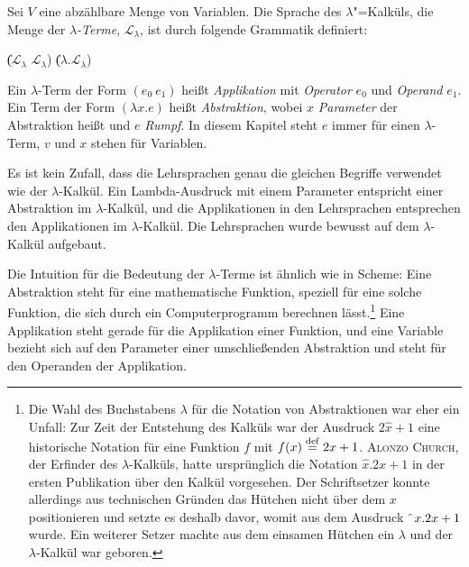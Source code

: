 \begin{definition}
  
  Sei $V$ eine abzählbare Menge von Variablen. 
  Die Sprache des $\lambda$"=Kalküls, die Menge der
  \textit{$\lambda$-Terme},
  $\mathcal{L}_{\lambda}$, ist
  durch folgende Grammatik definiert:
  \begin{grammar}
     \: 
    \> \| ($\mathcal{L}_{\lambda}$ $\mathcal{L}_{\lambda}$)
    \> \| ($\lambda$.$\mathcal{L}_{\lambda}$)
  \end{grammar}
%
Ein $\lambda$-Term der Form $(e_0~e_1)$ heißt 
\textit{Applikation} mit \textit{Operator} $e_0$ und \textit{Operand}
$e_1$.  Ein Term der Form $(\lambda x.e)$ heißt \textit{Abstraktion},
wobei $x$ \textit{Parameter} der Abstraktion heißt und $e$
\textit{Rumpf}.  In diesem Kapitel steht $e$ immer für
einen $\lambda$-Term, $v$ und $x$ stehen für Variablen.
\end{definition}
%
Es ist kein Zufall, dass die Lehrsprachen genau die gleichen Begriffe verwendet
wie der $\lambda$-Kalkül.  Ein Lambda-Ausdruck mit einem
Parameter entspricht einer Abstraktion im $\lambda$-Kalkül,
und die Applikationen in den Lehrsprachen entsprechen den Applikationen im
$\lambda$-Kalkül.  Die Lehrsprachen wurde bewusst auf dem
$\lambda$-Kalkül aufgebaut.

Die Intuition für die Bedeutung der $\lambda$-Terme ist ähnlich wie in
Scheme: Eine Abstraktion steht für eine mathematische Funktion,
speziell für eine solche Funktion, die sich durch ein Computerprogramm
berechnen lässt.\footnote{Die Wahl des Buchstabens $\lambda$ für die
  Notation von Abstraktionen war eher ein Unfall: Zur Zeit der
  Entstehung des Kalküls war der Ausdruck $2\hat{x}+1$ eine historische Notation für eine
  Funktion $f$ mit $f(x)\stackrel{\rm def}{=}{}2x+1$.  \textsc{Alonzo Church},
  der Erfinder des $\lambda$-Kalküls, hatte ursprünglich
  die Notation $\hat{x}.2x+1$ in der ersten Publikation über den
  Kalkül vorgesehen.  Der Schriftsetzer konnte allerdings aus
  technischen Gründen
  das Hütchen nicht über dem $x$ positionieren und setzte es deshalb
  davor, womit aus dem Ausdruck $\hat{~}\thinspace{}x.2x+1$ wurde.  Ein weiterer
  Setzer machte aus dem einsamen Hütchen ein $\lambda$ und der
  $\lambda$-Kalkül war geboren.}  Eine Applikation steht gerade für
die Applikation einer Funktion, und eine Variable bezieht sich auf den
Parameter einer umschließenden Abstraktion und steht für den Operanden
der Applikation.

